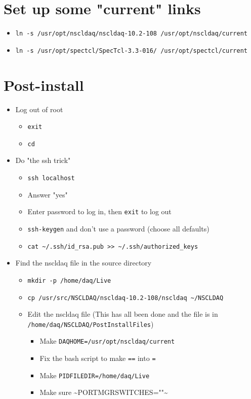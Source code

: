 \documentclass[11pt]{article}
\begin{document}
\section*{Set up some "current" links}
\label{sec-5}
\begin{itemize}
\item \verb~ln -s /usr/opt/nscldaq/nscldaq-10.2-108 /usr/opt/nscldaq/current~
\item \verb~ln -s /usr/opt/spectcl/SpecTcl-3.3-016/ /usr/opt/spectcl/current~
\end{itemize}

\section*{Post-install}
\label{sec-6}
\begin{itemize}
\item Log out of root
\begin{itemize}
\item \verb~exit~
\item \verb~cd~
\end{itemize}
\item Do "the ssh trick"
\begin{itemize}
\item \verb~ssh localhost~
\item Answer "yes"
\item Enter password to log in, then \verb~exit~ to log out
\item \verb~ssh-keygen~ and don't use a password (choose all defaults)
\item \verb,cat ~/.ssh/id_rsa.pub >> ~/.ssh/authorized_keys,
\end{itemize}
\item Find the nscldaq file in the source directory
\begin{itemize}
\item \verb~mkdir -p /home/daq/Live~
\item \verb,cp /usr/src/NSCLDAQ/nscldaq-10.2-108/nscldaq ~/NSCLDAQ,
\item Edit the nscldaq file (This has all been done and the file is in
      \verb~/home/daq/NSCLDAQ/PostInstallFiles~)
\begin{itemize}
\item Make \verb~DAQHOME=/usr/opt/nscldaq/current~
\item Fix the bash script to make \verb~==~ into \verb~=~
\item Make \verb~PIDFILEDIR=/home/daq/Live~
\item Make sure \textasciitilde{}PORTMGRSWITCHES=""\textasciitilde{}

\end{itemize}
\end{itemize}
\end{itemize}
\end{document}
